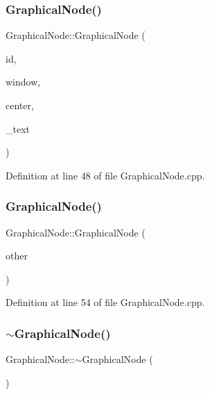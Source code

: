 \subsubsection{\texorpdfstring{Graphical\+Node()}{GraphicalNode()}\hspace{0.1cm}{\footnotesize\ttfamily [4/5]}}
{\footnotesize\ttfamily Graphical\+Node\+::\+Graphical\+Node (\begin{DoxyParamCaption}\item[{\hyperlink{_graphical_element_8h_ade5fd6c85839a416577ff9de1605141e}{Element\+Key}}]{id,  }\item[{wx\+Window $\ast$}]{window,  }\item[{wx\+Point2\+D\+Double}]{center,  }\item[{const std\+::string \&}]{\+\_\+text }\end{DoxyParamCaption})}



Definition at line 48 of file Graphical\+Node.\+cpp.

\mbox{\label{class_graphical_node_a63c2c7ac34c3f9b3a1383dd157cf731c}} 
\subsubsection{\texorpdfstring{Graphical\+Node()}{GraphicalNode()}\hspace{0.1cm}{\footnotesize\ttfamily [5/5]}}
{\footnotesize\ttfamily Graphical\+Node\+::\+Graphical\+Node (\begin{DoxyParamCaption}\item[{const \hyperlink{class_graphical_node}{Graphical\+Node} \&}]{other }\end{DoxyParamCaption})}



Definition at line 54 of file Graphical\+Node.\+cpp.

\mbox{\label{class_graphical_node_a044a09111bb337580f2a40fcff42ef6f}} 
\subsubsection{\texorpdfstring{$\sim$\+Graphical\+Node()}{~GraphicalNode()}}
{\footnotesize\ttfamily Graphical\+Node\+::$\sim$\+Graphical\+Node (\begin{DoxyParamCaption}{ }\end{DoxyParamCaption})}



